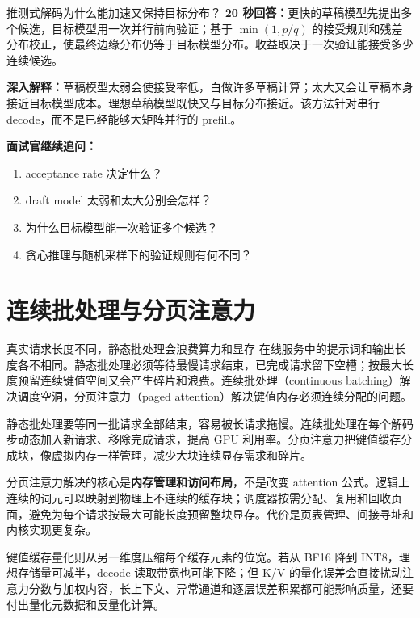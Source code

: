 \begin{interviewbox}{推测式解码为什么能加速又保持目标分布？}
\textbf{20 秒回答：}更快的草稿模型先提出多个候选，目标模型用一次并行前向验证；基于 $\min(1,p/q)$ 的接受规则和残差分布校正，使最终边缘分布仍等于目标模型分布。收益取决于一次验证能接受多少连续候选。

\textbf{深入解释：}草稿模型太弱会使接受率低，白做许多草稿计算；太大又会让草稿本身接近目标模型成本。理想草稿模型既快又与目标分布接近。该方法针对串行 decode，而不是已经能够大矩阵并行的 prefill。

\textbf{面试官继续追问：}
\begin{enumerate}
  \item acceptance rate 决定什么？
  \item draft model 太弱和太大分别会怎样？
  \item 为什么目标模型能一次验证多个候选？
  \item 贪心推理与随机采样下的验证规则有何不同？
\end{enumerate}
\end{interviewbox}

\section{连续批处理与分页注意力}
\label{sec:pagedattention}

\begin{motivationbox}{真实请求长度不同，静态批处理会浪费算力和显存}
在线服务中的提示词和输出长度各不相同。静态批处理必须等待最慢请求结束，已完成请求留下空槽；按最大长度预留连续键值空间又会产生碎片和浪费。连续批处理（continuous batching）解决调度空洞，分页注意力（paged attention）解决键值内存必须连续分配的问题。
\end{motivationbox}

静态批处理要等同一批请求全部结束，容易被长请求拖慢。连续批处理在每个解码步动态加入新请求、移除完成请求，提高 GPU 利用率。分页注意力把键值缓存分成块，像虚拟内存一样管理，减少大块连续显存需求和碎片。

分页注意力解决的核心是\textbf{内存管理和访问布局}，不是改变 attention 公式。逻辑上连续的词元可以映射到物理上不连续的缓存块；调度器按需分配、复用和回收页面，避免为每个请求按最大可能长度预留整块显存。代价是页表管理、间接寻址和内核实现更复杂。

键值缓存量化则从另一维度压缩每个缓存元素的位宽。若从 BF16 降到 INT8，理想存储量可减半，decode 读取带宽也可能下降；但 K/V 的量化误差会直接扰动注意力分数与加权内容，长上下文、异常通道和逐层误差积累都可能影响质量，还要付出量化元数据和反量化计算。

